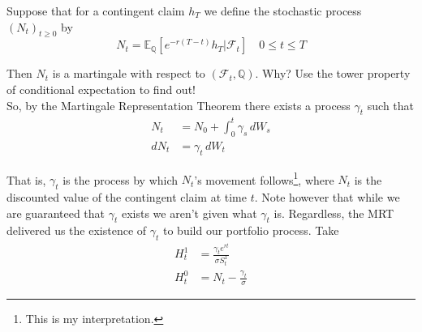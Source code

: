 \documentclass[12pt]{article}
\newlength\tindent
\renewcommand{\indent}{\hspace*{\tindent}}
\begin{document}
Suppose that for a contingent claim $h_T$ we define the stochastic process $(N_t)_{t\geq 0}$ by
\begin{equation*}
	N_t = \mathbb E_{\mathbb Q}[e^{-r(T-t)}h_T|\mathcal F_t] \quad 0 \leq t \leq T
\end{equation*}

Then $N_t$ is a martingale with respect to $(\mathcal F_t, \mathbb Q)$. Why? Use the tower property of conditional expectation to find out! \\

So, by the Martingale Representation Theorem there exists a process $\gamma_t$ such that 
\begin{align*}
	N_t &= N_0 + \int^t_0 \gamma_s\,dW_s \\
	dN_t &= \gamma_t\,dW_t
\end{align*}

\indent That is, $\gamma_t$ is the process by which $N_t$'s movement follows\footnote{This is my interpretation.}, where $N_t$ is the discounted value of the contingent claim at time $t$. Note however that while we are guaranteed that $\gamma_t$ exists we aren't given what $\gamma_t$ is. Regardless, the MRT delivered us the existence of $\gamma_t$ to build our portfolio process. Take
\begin{align*}
	H^1_t &= \frac{\gamma_te^{rt}}{\sigma S^1_t} \\
	H^0_t &= N_t - \frac{\gamma_t}{\sigma}
\end{align*}
\end{document}
